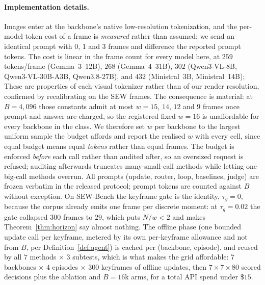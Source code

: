 \documentclass[10pt]{article}
\newcommand{\VnBackbones}{seven}
\providecommand{\VnBackbones}{--}
\renewcommand{\VnBackbones}{7}
\theoremstyle{definition}
\theoremstyle{plain}
\begin{document}
\paragraph{Implementation details.} Images enter at the backbone's native low-resolution tokenization, and the per-model token cost of a frame is \emph{measured} rather than assumed: we send an identical prompt with $0$, $1$ and $3$ frames and difference the reported prompt tokens. The cost is linear in the frame count for every model here, at $259$ tokens/frame (Gemma~3~12B), $268$ (Gemma~4~31B), $302$ (Qwen3-VL-8B, Qwen3-VL-30B-A3B, Qwen3.8-27B), and $432$ (Ministral~3B, Ministral~14B); These are properties of each visual tokenizer rather than of our render resolution, confirmed by recalibrating on the SEW frames. The consequence is material: at $B{=}4{,}096$ those constants admit at most $w{=}15$, $14$, $12$ and $9$ frames once prompt and answer are charged, so the registered fixed $w{=}16$ is unaffordable for every backbone in the class. We therefore set $w$ per backbone to the largest uniform sample the budget affords and report the realised $w$ with every cell, since equal budget means equal \emph{tokens} rather than equal frames. The budget is enforced \emph{before} each call rather than audited after, so an oversized request is refused; auditing afterwards truncates many-small-call methods while letting one-big-call methods overrun. All prompts (update, router, loop, baselines, judge) are frozen verbatim in the released protocol; prompt tokens are counted against $B$ without exception. On SEW-Bench the keyframe gate is the identity, $\tau_g{=}0$, because the corpus already emits one frame per discrete moment: at $\tau_g{=}0.02$ the gate collapsed $300$ frames to $29$, which puts $N/w<2$ and makes Theorem~\ref{thm:horizon} say almost nothing. The offline phase (one bounded update call per keyframe, metered by its own per-keyframe allowance and not from $B$, per Definition~\ref{def:agent}) is cached per (backbone, episode), and reused by all $7$ methods $\times$ $3$ subtests, which is what makes the grid affordable: \VnBackbones{} backbones $\times$ $4$ episodes $\times$ $300$ keyframes of offline updates, then $\VnBackbones{}\times7\times80$ scored decisions plus the ablation and $B{=}16$k arms, for a total API spend under \$$15$.
\end{document}
